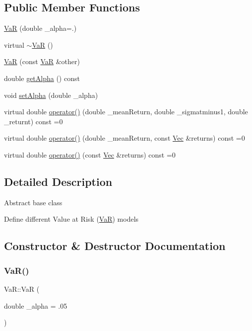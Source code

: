 \subsection*{Public Member Functions}
\begin{DoxyCompactItemize}
\item 
\hyperlink{classVaR_a7ee643c7cd27654b357d80718a830750}{VaR} (double \+\_\+alpha=.)
\item 
virtual \hyperlink{classVaR_af1492f7ffa13239a77af0a2c647f8358}{$\sim$\+VaR} ()
\item 
\hyperlink{classVaR_a21cafaf403766ed1f5ba3d957357d789}{VaR} (const \hyperlink{classVaR}{VaR} \&other)
\item 
double \hyperlink{classVaR_aa2c6adc33bdf14b0908f4586254726c9}{get\+Alpha} () const
\item 
void \hyperlink{classVaR_a5834560649dcbe686a47eaba4f0359b9}{set\+Alpha} (double \+\_\+alpha)
\item 
virtual double \hyperlink{classVaR_a28e1a1be9e386ed4e8503e54db4033bd}{operator()} (double \+\_\+mean\+Return, double \+\_\+sigmatminus1, double \+\_\+returnt) const =0
\item 
virtual double \hyperlink{classVaR_a31cb62626488715a9133679feaba31e5}{operator()} (double \+\_\+mean\+Return, const \hyperlink{compute__returns__eigen_8h_a1eb6a9306ef406d7975f3cbf2e247777}{Vec} \&returns) const =0
\item 
virtual double \hyperlink{classVaR_a1bd868d9953bfaeb49f5bf7d16986631}{operator()} (const \hyperlink{compute__returns__eigen_8h_a1eb6a9306ef406d7975f3cbf2e247777}{Vec} \&returns) const =0
\end{DoxyCompactItemize}


\subsection{Detailed Description}
Abstract base class

Define different Value at Risk (\hyperlink{classVaR}{VaR}) models 

\subsection{Constructor \& Destructor Documentation}
\hypertarget{classVaR_a7ee643c7cd27654b357d80718a830750}{}\label{classVaR_a7ee643c7cd27654b357d80718a830750} 
\subsubsection{\texorpdfstring{Va\+R()}{VaR()}\hspace{0.1cm}{\footnotesize\ttfamily [1/2]}}
{\footnotesize\ttfamily Va\+R\+::\+VaR (\begin{DoxyParamCaption}\item[{double}]{\+\_\+alpha = {\ttfamily .05} }\end{DoxyParamCaption})}

